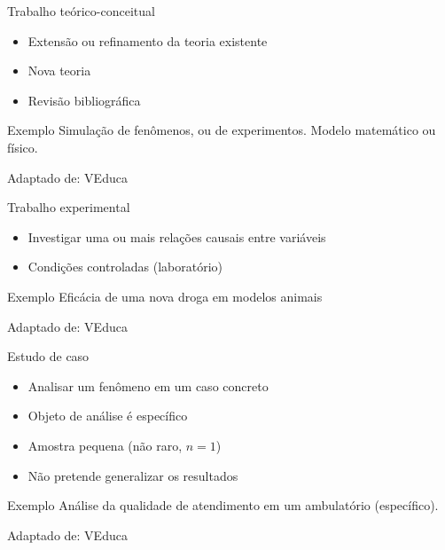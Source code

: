 \documentclass{beamer}
\begin{document}
\begin{frame}{Trabalho teórico-conceitual}
  \begin{itemize}
    \footnotesize
  \item Extensão ou refinamento da teoria existente
  \item Nova teoria
  \item Revisão bibliográfica
  \end{itemize}
  \begin{exampleblock}{Exemplo}
    \scriptsize
    Simulação de fenômenos, ou de experimentos. Modelo matemático ou físico.
  \end{exampleblock}

  \vfill
  \scriptsize
  Adaptado de: VEduca
\end{frame}

\begin{frame}{Trabalho experimental}
  \begin{itemize}
    \footnotesize
  \item Investigar uma ou mais relações causais entre variáveis
  \item Condições controladas (laboratório)
  \end{itemize}
  \begin{exampleblock}{Exemplo}
    \scriptsize
    Eficácia de uma nova droga em modelos animais
  \end{exampleblock}

  \vfill
  \scriptsize
  Adaptado de: VEduca
\end{frame}

\begin{frame}{Estudo de caso}
  \begin{itemize}
    \footnotesize
  \item Analisar um fenômeno em um caso concreto
  \item Objeto de análise é específico
  \item Amostra pequena (não raro, $n=1$)
  \item Não pretende generalizar os resultados
  \end{itemize}
  \begin{exampleblock}{Exemplo}
    \scriptsize
    Análise da qualidade de atendimento em um ambulatório (específico).
  \end{exampleblock}

  \vfill
  \scriptsize
  Adaptado de: VEduca
\end{frame}
\end{document}
